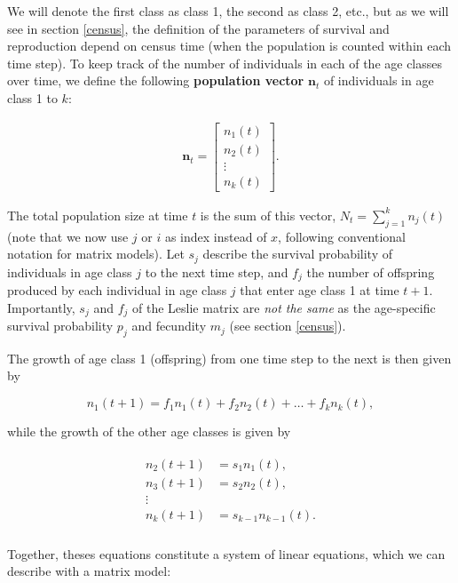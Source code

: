 \documentclass[
]{book}
\begin{document}
We will denote the first class as class 1, the second as class 2, etc., but as we will see in section \ref{census}, the definition of the parameters of survival and reproduction depend on census time (when the population is counted within each time step). To keep track of the number of individuals in each of the age classes over time, we define the following \textbf{population vector} \(\mathbf{n}_t\) of individuals in age class 1 to \(k\):

\begin{align}
\mathbf{n}_t=\left[\begin{matrix} n_1(t) \\ n_2(t)\\ \vdots \\ n_k(t) \end{matrix} \right].
\label{eq:popvec}
\end{align}

The total population size at time \(t\) is the sum of this vector, \(N_t=\sum_{j=1}^kn_j(t)\) (note that we now use \(j\) or \(i\) as index instead of \(x\), following conventional notation for matrix models). Let \(s_j\) describe the survival probability of individuals in age class \(j\) to the next time step, and \(f_j\) the number of offspring produced by each individual in age class \(j\) that enter age class 1 at time \(t+1\). Importantly, \(s_j\) and \(f_j\) of the Leslie matrix are \emph{not the same} as the age-specific survival probability \(p_j\) and fecundity \(m_j\) (see section \ref{census}).

The growth of age class 1 (offspring) from one time step to the next is then given by

\begin{equation}
n_1(t+1)=f_1n_1(t)+f_2n_2(t)+\ldots +f_kn_k(t),
\label{eq:AgeGrowth1}
\end{equation}

while the growth of the other age classes is given by

\begin{align}
\begin{split}
n_2(t+1)&=s_1n_1(t),\\
n_3(t+1)&=s_2n_2(t),\\
\vdots \\
n_k(t+1)&=s_{k-1}n_{k-1}(t).\\
\end{split}
\label{eq:AgeGrowth2}
\end{align}

Together, theses equations constitute a system of linear equations, which we can describe with a matrix model:
\end{document}
